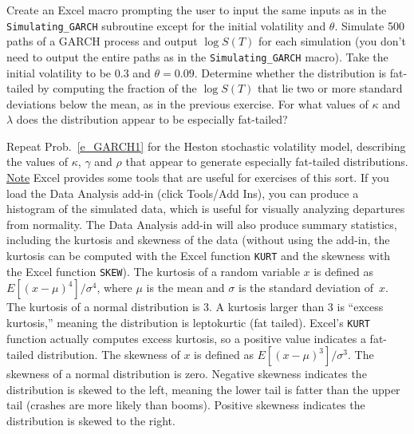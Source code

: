 \begin{prob} \label{e_GARCH1} Create an Excel macro prompting the user to input the same inputs as in the \verb!Simulating_GARCH! subroutine except for the initial volatility and $\theta$.  Simulate 500 paths of a GARCH process and output $\log S(T)$ for each simulation (you don't need to output the entire paths as in the \verb!Simulating_GARCH! macro).  Take the initial volatility to be 0.3 and $\theta = 0.09$.  Determine whether the distribution is fat-tailed by computing the fraction of the $\log S(T)$ that lie two or more standard deviations below the mean, as in the previous exercise.  For what values of $\kappa$ and $\lambda$ does the distribution appear to be especially fat-tailed? 
\end{prob}\begin{prob} Repeat Prob.~\ref{e_GARCH1} for the Heston stochastic volatility model, describing the values of $\kappa$,  $\gamma$ and $\rho$ that appear to generate especially fat-tailed distributions.
\next
\underline{Note}
\next
Excel provides some tools that are useful for exercises of this sort.  If you load the Data Analysis add-in (click Tools/Add Ins), you can produce a histogram of the simulated data, which is useful for visually analyzing departures from normality.  The Data Analysis add-in will also produce summary statistics, including the kurtosis and skewness of the data (without using the add-in, the kurtosis can be computed with the Excel function \verb!KURT! and the skewness with the Excel function \verb!SKEW!).  The kurtosis of a random variable $x$ is defined as $E[(x-\mu)^4]/\sigma^4$, where $\mu$ is the mean and $\sigma$ is the standard deviation of~$x$.  The kurtosis of a normal distribution is 3.  A kurtosis larger than 3 is ``excess kurtosis,'' meaning the distribution is leptokurtic (fat tailed).  Excel's \verb!KURT! function actually computes excess kurtosis, so a positive value indicates a fat-tailed distribution.  The skewness of $x$ is defined as $E[(x-\mu)^3]/\sigma^3$.  The skewness of a normal distribution is zero.  Negative skewness indicates the distribution is skewed to the left, meaning the lower tail is fatter than the upper tail (crashes are more likely than booms).  Positive skewness indicates the distribution is skewed to the right.
\end{prob}